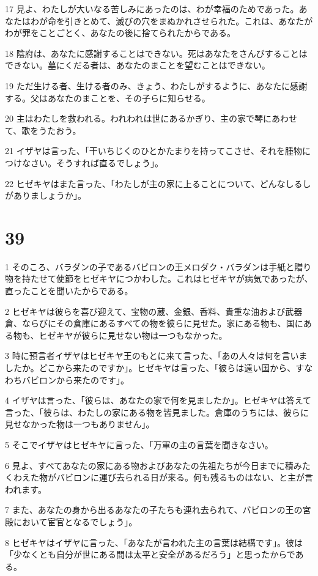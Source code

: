 \par 17 見よ、わたしが大いなる苦しみにあったのは、わが幸福のためであった。あなたはわが命を引きとめて、滅びの穴をまぬかれさせられた。これは、あなたがわが罪をことごとく、あなたの後に捨てられたからである。
\par 18 陰府は、あなたに感謝することはできない。死はあなたをさんびすることはできない。墓にくだる者は、あなたのまことを望むことはできない。
\par 19 ただ生ける者、生ける者のみ、きょう、わたしがするように、あなたに感謝する。父はあなたのまことを、その子らに知らせる。
\par 20 主はわたしを救われる。われわれは世にあるかぎり、主の家で琴にあわせて、歌をうたおう。
\par 21 イザヤは言った、「干いちじくのひとかたまりを持ってこさせ、それを腫物につけなさい。そうすれば直るでしょう」。
\par 22 ヒゼキヤはまた言った、「わたしが主の家に上ることについて、どんなしるしがありましょうか」。

\chapter{39}

\par 1 そのころ、バラダンの子であるバビロンの王メロダク・バラダンは手紙と贈り物を持たせて使節をヒゼキヤにつかわした。これはヒゼキヤが病気であったが、直ったことを聞いたからである。
\par 2 ヒゼキヤは彼らを喜び迎えて、宝物の蔵、金銀、香料、貴重な油および武器倉、ならびにその倉庫にあるすべての物を彼らに見せた。家にある物も、国にある物も、ヒゼキヤが彼らに見せない物は一つもなかった。
\par 3 時に預言者イザヤはヒゼキヤ王のもとに来て言った、「あの人々は何を言いましたか。どこから来たのですか」。ヒゼキヤは言った、「彼らは遠い国から、すなわちバビロンから来たのです」。
\par 4 イザヤは言った、「彼らは、あなたの家で何を見ましたか」。ヒゼキヤは答えて言った、「彼らは、わたしの家にある物を皆見ました。倉庫のうちには、彼らに見せなかった物は一つもありません」。
\par 5 そこでイザヤはヒゼキヤに言った、「万軍の主の言葉を聞きなさい。
\par 6 見よ、すべてあなたの家にある物およびあなたの先祖たちが今日までに積みたくわえた物がバビロンに運び去られる日が来る。何も残るものはない、と主が言われます。
\par 7 また、あなたの身から出るあなたの子たちも連れ去られて、バビロンの王の宮殿において宦官となるでしょう」。
\par 8 ヒゼキヤはイザヤに言った、「あなたが言われた主の言葉は結構です」。彼は「少なくとも自分が世にある間は太平と安全があるだろう」と思ったからである。

